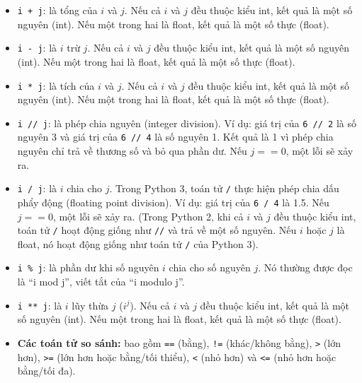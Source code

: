 \begin{tcolorbox}[title=Hình 2.1: Các toán tử trên kiểu dữ liệu int và float]

\begin{itemize}
    \item \texttt{i + j}: là tổng của $i$ và $j$. Nếu cả $i$ và $j$ đều thuộc kiểu int, kết quả là một số nguyên (int). Nếu một trong hai là float, kết quả là một số thực (float).

    \item \texttt{i - j}: là $i$ trừ $j$. Nếu cả $i$ và $j$ đều thuộc kiểu int, kết quả là một số nguyên (int). Nếu một trong hai là float, kết quả là một số thực (float).

    \item \texttt{i * j}: là tích của $i$ và $j$. Nếu cả $i$ và $j$ đều thuộc kiểu int, kết quả là một số nguyên (int). Nếu một trong hai là float, kết quả là một số thực (float).

    \item \texttt{i // j}: là phép chia nguyên (integer division). Ví dụ: giá trị của \texttt{6 // 2} là số nguyên 3 và giá trị của \texttt{6 // 4} là số nguyên 1. Kết quả là 1 vì phép chia nguyên chỉ trả về thương số và bỏ qua phần dư. Nếu $j == 0$, một lỗi sẽ xảy ra.

    \item \texttt{i / j}: là $i$ chia cho $j$. Trong Python 3, toán tử \texttt{/} thực hiện phép chia dấu phẩy động (floating point division). Ví dụ: giá trị của \texttt{6 / 4} là 1.5. Nếu $j == 0$, một lỗi sẽ xảy ra. (Trong Python 2, khi cả $i$ và $j$ đều thuộc kiểu int, toán tử \texttt{/} hoạt động giống như \texttt{//} và trả về một số nguyên. Nếu $i$ hoặc $j$ là float, nó hoạt động giống như toán tử \texttt{/} của Python 3).

    \item \texttt{i \% j}: là phần dư khi số nguyên $i$ chia cho số nguyên $j$. Nó thường được đọc là ``i mod j'', viết tắt của ``i modulo j''.

    \item \texttt{i ** j}: là $i$ lũy thừa $j$ ($i^j$). Nếu cả $i$ và $j$ đều thuộc kiểu int, kết quả là một số nguyên (int). Nếu một trong hai là float, kết quả là một số thực (float).

    \item \textbf{Các toán tử so sánh:} bao gồm \texttt{==} (bằng), \texttt{!=} (khác/không bằng), \texttt{>} (lớn hơn), \texttt{>=} (lớn hơn hoặc bằng/tối thiểu), \texttt{<} (nhỏ hơn) và \texttt{<=} (nhỏ hơn hoặc bằng/tối đa).
\end{itemize}


\end{tcolorbox}

